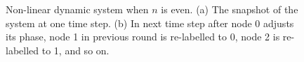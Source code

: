 \begin{figure}[!t]
\centerline{
	\hfil
}
\caption{Non-linear dynamic system when $n$ is even. (a) The snapshot of the system at one time step. (b) In next time step after node 0 adjusts its phase, node 1 in previous round is re-labelled to 0, node 2 is re-labelled to 1, and so on.}
\label{fig:n-even}
\lofcont
\end{figure}
